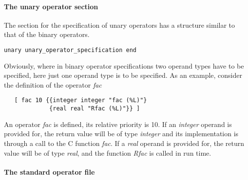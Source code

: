 \documentclass[11pt]{article}
\begin{document}
\paragraph{The unary operator section}
The section for the specification of unary operators has a structure
similar to that of the binary operators.
{\footnotesize
\begin{verbatim}
unary unary_operator_specification end
\end{verbatim}
}
Obviously, where in binary operator specifications two operand types
have to be specified, here just one operand type is to
be specified.
As an example, consider the definition of the operator {\em fac}
{\footnotesize
\begin{verbatim}
   [ fac 10 {{integer integer "fac (%L)"}
             {real real "Rfac (%L)"}} ]
\end{verbatim}
}
An operator {\em fac} is defined, its relative priority is 10.
If an {\em integer}
operand is provided for, the return value will be of type {\em integer}
and its implementation is through a call to the C function {\em fac}. If
a  {\em real} operand is provided for, the return value will be of type
{\em real}, and the function {\em Rfac} is called in run time.
\paragraph{The standard operator file}
\end{document}

